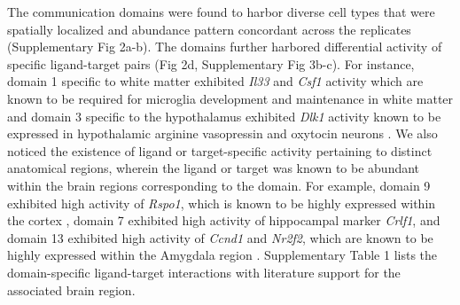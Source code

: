 The communication domains were found to harbor diverse cell types that were spatially localized and abundance pattern concordant across the replicates (Supplementary Fig 2a-b). The domains further harbored differential activity of specific ligand-target pairs (Fig 2d, Supplementary Fig 3b-c). For instance, domain 1 specific to white matter exhibited \textit{Il33} and \textit{Csf1} activity which are known to be required for microglia development and maintenance in white matter \citep{10.3389/fimmu.2019.02199, 10.3389/fimmu.2018.02596} and domain 3 specific to the hypothalamus exhibited \textit{Dlk1} activity known to be expressed in hypothalamic arginine vasopressin and oxytocin neurons \citep{10.1371/journal.pone.0036134}.  We also noticed the existence of ligand or target-specific activity pertaining to distinct anatomical regions, wherein the ligand or target was known to be abundant within the brain regions corresponding to the domain. For example, domain 9 exhibited high activity of \textit{Rspo1}, which is known to be highly expressed within the cortex \citep{10.1210/en.2013-1550, Miller2019}, domain 7 exhibited high activity of hippocampal marker \textit{Crlf1}, and domain 13 exhibited high activity of \textit{Ccnd1} and \textit{Nr2f2}, which are known to be highly expressed within the Amygdala region \citep{KOELLER2008230, 10.1242/dev.075564}. Supplementary Table 1 lists the domain-specific ligand-target interactions with literature support for the associated brain region. \par 



